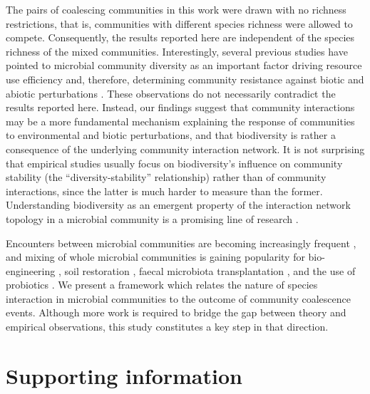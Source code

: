 \documentclass[10pt,letterpaper]{article}
\begin{document}
The pairs of coalescing communities in this work were drawn with no richness restrictions, that is, communities with different species richness were allowed to compete. Consequently, the results reported here are independent of the species richness of the mixed communities. Interestingly, several previous studies have pointed to microbial community diversity as an important factor driving resource use efficiency and, therefore, determining community resistance against biotic and abiotic perturbations \cite{Girvan2005, Eisenhauer2012, Maron2018}. These observations do not necessarily contradict the results reported here. Instead, our findings suggest that community interactions may be a more fundamental mechanism explaining the response of communities to environmental and biotic perturbations, and that biodiversity is rather a consequence of the underlying community interaction network. It is not surprising that empirical studies usually focus on biodiversity's influence on community stability (the ``diversity-stability'' relationship) rather than of community interactions, since the latter is much harder to measure than the former. Understanding biodiversity as an emergent property of the interaction network topology in a microbial community is a promising line of research \cite{Ratzke2020a}.


Encounters between microbial communities  are becoming increasingly frequent \cite{Seebens2017}, and mixing of whole microbial communities is gaining popularity for bio-engineering \cite{Rillig2016}, soil restoration \cite{Calderon2017}, faecal microbiota transplantation \cite{Wang2019, Wilson2019}, and the use of probiotics \cite{Lindemann2016}. We present a framework which relates the nature of species interaction in microbial communities to the outcome of community coalescence events. Although more work is required to bridge the gap between theory and empirical observations, this study constitutes a key step in that direction.

\section*{Supporting information}
\end{document}
